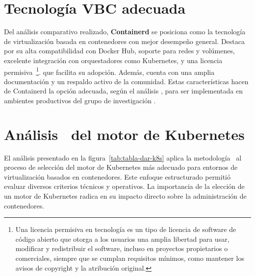 \section{Tecnología VBC adecuada}
\noindent
Del análisis comparativo realizado, \textbf{Containerd} se posiciona como la tecnología de virtualización basada en contenedores con mejor desempeño general. Destaca por su alta compatibilidad con Docker Hub, soporte para redes y volúmenes, excelente integración con orquestadores como Kubernetes, y una licencia permisiva~\footnote{Una licencia permisiva en tecnología es un tipo de licencia de software de código abierto que otorga a los usuarios una amplia libertad para usar, modificar y redistribuir el software, incluso en proyectos propietarios o comerciales, siempre que se cumplan requisitos mínimos, como mantener los avisos de copyright y la atribución original.}. que facilita su adopción. Además, cuenta con una amplia documentación y un respaldo activo de la comunidad. Estas características hacen de Containerd la opción adecuada, según el análisis \DAR, para ser implementada en ambientes productivos del grupo de investigación \GRID.
\clearpage
\section{Análisis \DAR\ del motor de Kubernetes}
\noindent
El análisis presentado en la figura~\ref{tab:tabla-dar-k8s} aplica la metodología \DAR\ al proceso de selección del motor de Kubernetes más adecuado para entornos de virtualización basados en contenedores. Este enfoque estructurado permitió evaluar diversos criterios técnicos y operativos. La importancia de la elección de un motor de Kubernetes radica en su impacto directo sobre la administración de contenedores. 
